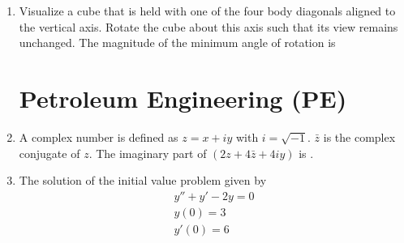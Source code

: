 \documentclass[journal,12pt,onecolumn]{IEEEtran}
\theoremstyle{remark}
\begin{document}
\begin{enumerate}
\begin{enumerate}
\end{enumerate}
\hfill{}
\item  Visualize a cube that is held with one of the four body diagonals aligned to the vertical axis. Rotate the cube about this axis such that its view remains unchanged. The magnitude of the minimum angle of rotation is
\begin{enumerate}
\end{enumerate}
\hfill{}



\section*{Petroleum Engineering (PE)}



 \item A complex number is defined as $z = x + iy$ with $i = \sqrt{-1}$. $\bar{z}$ is the complex conjugate of $z$. The imaginary part of $(2z + 4\bar{z} + 4iy)$ is \underline{\hspace{1cm}}.
\begin{enumerate}
\end{enumerate}
\hfill{}
 \item The solution of the initial value problem given by
 \begin{align}
 y'' + y' - 2y = 0\\ 
 y(0) = 3\\ 
 y'(0) = 6
 \end{align}

\begin{enumerate}
\end{enumerate}
\hfill{}




\end{enumerate}
\end{document}
